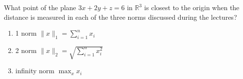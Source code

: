 \begin{problem}
What point of the plane $3x + 2y+ z = 6$ in $\mathbb{R}^3$ is closest to the origin when the distance is measured in each of the three norms discussed during the lectures?
\end{problem}

\begin{solution}
\begin{enumerate}
	\item 1 norm $\lVert x \rVert_1 = \sum_{i = 1}^n x_i$
	
	\item 2 norm $\lVert x \rVert_2 = \sqrt{\sum_{i = 1}^n x_i^2}$
	
	\item infinity norm $\max_x x_i$
	
\end{enumerate}
\end{solution}

 	

